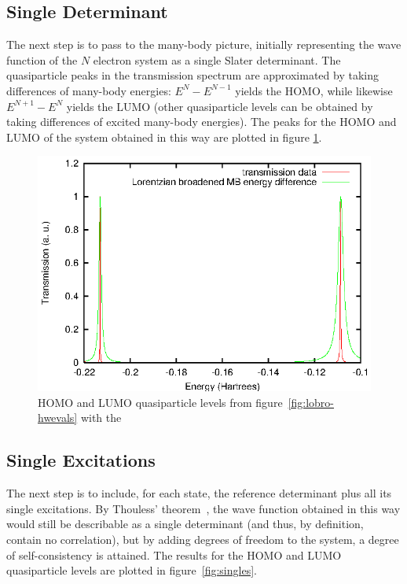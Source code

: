 \subsection{Single Determinant}
\label{subsec:SingleDeterminant}

The next step is to pass to the many-body picture, initially representing the
wave function of the $N$ electron system as a single Slater determinant. The
quasiparticle peaks in the transmission spectrum are approximated by taking
differences of many-body energies: $E^N - E^{N-1}$ yields the HOMO, while
likewise $E^{N+1} - E^N$ yields the LUMO (other quasiparticle levels can be
obtained by taking differences of excited many-body energies). The peaks for
the HOMO and LUMO of the system obtained in this way are plotted in figure
\ref{fig:nobranch}.

\begin{figure}
	\begin{center}
		\includegraphics[width=0.9\linewidth]{figures/nobranch}
	\end{center}
	\caption{HOMO and LUMO quasiparticle levels from
	figure~\ref{fig:lobro-hwevals} with the }
	\label{fig:nobranch}
\end{figure}

\subsection{Single Excitations}
\label{subsec:singles}

The next step is to include, for each state, the reference determinant plus all
its single excitations. By Thouless' theorem~\cite{Thouless}, the wave function
obtained in this way would still be describable as a single determinant (and
thus, by definition, contain no correlation), but by adding degrees of freedom
to the system, a degree of self-consistency is attained. The results for the
HOMO and LUMO quasiparticle levels are plotted in figure~\ref{fig:singles}.


